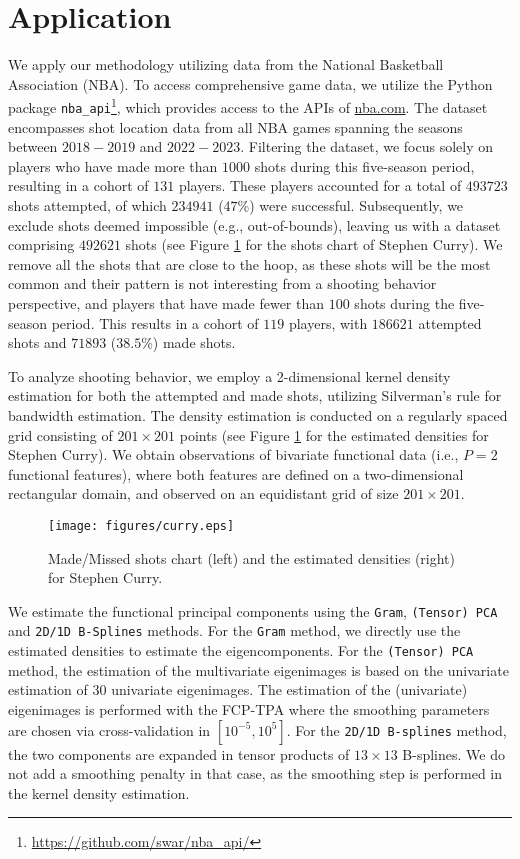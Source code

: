 \section{Application} %
\label{sec:application}

We apply our methodology utilizing data from the National Basketball Association (NBA). To access comprehensive game data, we utilize the Python package \texttt{nba\_api}\footnote{\url{https://github.com/swar/nba_api/}}, which provides access to the APIs of \url{nba.com}. The dataset encompasses shot location data from all NBA games spanning the seasons between $2018-2019$ and $2022-2023$. Filtering the dataset, we focus solely on players who have made more than $1000$ shots during this five-season period, resulting in a cohort of $131$ players. These players accounted for a total of $493723$ shots attempted, of which $234941$ ($47\%$) were successful. Subsequently, we exclude shots deemed impossible (e.g., out-of-bounds), leaving us with a dataset comprising $492621$ shots (see Figure \ref{fig:shoots_make_miss} for the shots chart of Stephen Curry). We remove all the shots that are close to the hoop, as these shots will be the most common and their pattern is not interesting from a shooting behavior perspective, and players that have made fewer than $100$ shots during the five-season period. This results in a cohort of $119$ players, with $186621$ attempted shots and $71893$ ($38.5\%$) made shots.

To analyze shooting behavior, we employ a 2-dimensional kernel density estimation for both the attempted and made shots, utilizing Silverman's rule \citep{silvermanDensityEstimationStatistics1986} for bandwidth estimation. The density estimation is conducted on a regularly spaced grid consisting of $201 \times 201$ points (see Figure \ref{fig:shoots_make_miss} for the estimated densities for Stephen Curry). We obtain observations of bivariate functional data (i.e., $P = 2$ functional features), where both features are defined on a two-dimensional rectangular domain, and observed on an equidistant grid of size $201 \times 201$.
\begin{figure}
    \centering
    \texttt{[image: figures/curry.eps]}
    \caption{Made/Missed shots chart (left) and the estimated densities (right) for Stephen Curry.}
    \label{fig:shoots_make_miss}
\end{figure}


We estimate the functional principal components using the \texttt{Gram}, \texttt{(Tensor) PCA} and \texttt{2D/1D B-Splines} methods. For the \texttt{Gram} method, we directly use the estimated densities to estimate the eigencomponents. For the \texttt{(Tensor) PCA} method, the estimation of the multivariate eigenimages is based on the univariate estimation of $30$ univariate eigenimages. The estimation of the (univariate) eigenimages is performed with the FCP-TPA where the smoothing parameters are chosen via cross-validation in $[10^{-5}, 10^5]$. For the \texttt{2D/1D B-splines} method, the two components are expanded in tensor products of $13 \times 13$ B-splines. We do not add a smoothing penalty in that case, as the smoothing step is performed in the kernel density estimation.

